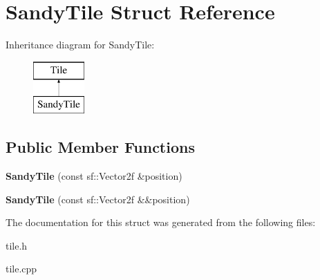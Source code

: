 \hypertarget{structSandyTile}{}\section{Sandy\+Tile Struct Reference}
\label{structSandyTile}
Inheritance diagram for Sandy\+Tile\+:\begin{figure}[H]
\begin{center}
\leavevmode
\includegraphics[height=2.000000cm]{structSandyTile}
\end{center}
\end{figure}
\subsection*{Public Member Functions}
\begin{DoxyCompactItemize}
\item 
\mbox{\label{structSandyTile_abe47dff8443bf253df6c723894ea17ca}} 
{\bfseries Sandy\+Tile} (const sf\+::\+Vector2f \&position)
\item 
\mbox{\label{structSandyTile_abf3581d4b2dbb27675ed3f1eab38324d}} 
{\bfseries Sandy\+Tile} (const sf\+::\+Vector2f \&\&position)
\end{DoxyCompactItemize}


The documentation for this struct was generated from the following files\+:\begin{DoxyCompactItemize}
\item 
tile.\+h\item 
tile.\+cpp\end{DoxyCompactItemize}

